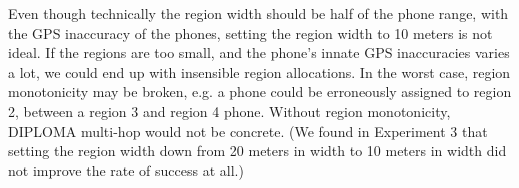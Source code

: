 Even though technically the region width should be half of the phone range, with the GPS inaccuracy of the phones, setting the region width to 10 meters is not ideal. If the regions are too small, and the phone's innate GPS inaccuracies varies a lot, we could end up with insensible region allocations. In the worst case, region monotonicity may be broken, e.g. a phone could be erroneously assigned to region 2, between a region 3 and region 4 phone. Without region monotonicity, DIPLOMA multi-hop would not be concrete. (We found in Experiment 3 that setting the region width down from 20 meters in width to 10 meters in width did not improve the rate of success at all.)



